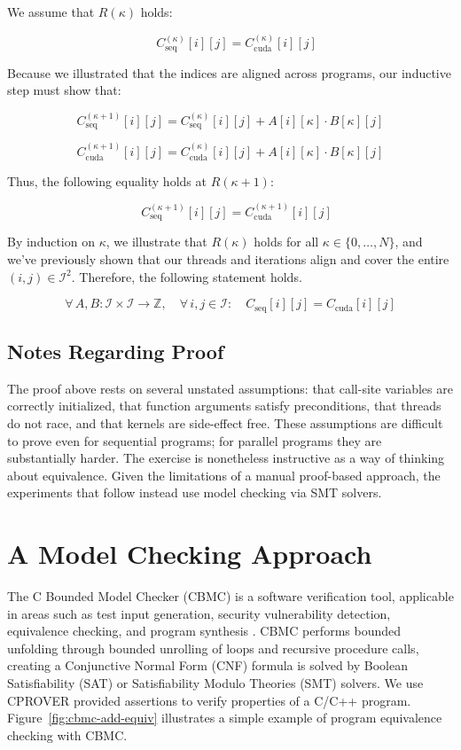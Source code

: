 \documentclass{article}
\begin{document}
We assume that $R(\kappa)$ holds: 

$$\quad C^{(\kappa)}_{\text{seq}}[i][j] = C^{(\kappa)}_{\text{cuda}}[i][j]$$

Because we illustrated that the indices are aligned across programs, our inductive step must show that:

$$C_{\text{seq}}^{(\kappa+1)}[i][j] = C_{\text{seq}}^{(\kappa)}[i][j] + A[i][\kappa] \cdot B[\kappa][j]$$

$$C_{\text{cuda}}^{(\kappa+1)}[i][j] = C_{\text{cuda}}^{(\kappa)}[i][j] + A[i][\kappa] \cdot B[\kappa][j]$$

Thus, the following equality holds at $R(\kappa + 1)$:

$$\quad C^{(\kappa + 1)}_{\text{seq}}[i][j] = C^{(\kappa + 1)}_{\text{cuda}}[i][j]$$

By induction on $\kappa$, we illustrate that $R(\kappa)$ holds for all $\kappa \in \{0,\ldots,N\}$, and we've previously shown that our threads and iterations align and cover the entire $(i,j) \in \mathcal{I}^2$. Therefore, the following statement holds.

$$\forall\, A, B : \mathcal{I} \times \mathcal{I} \to \mathbb{Z}, \quad \forall\, i, j \in \mathcal{I}: \quad C_{\text{seq}}[i][j] = C_{\text{cuda}}[i][j]$$

\subsection{Notes Regarding Proof}

The proof above rests on several unstated assumptions: that call-site variables are correctly initialized, that function arguments satisfy preconditions, that threads do not race, and that kernels are side-effect free. These assumptions are difficult to prove even for sequential programs; for parallel programs they are substantially harder. The exercise is nonetheless instructive as a way of thinking about equivalence. Given the limitations of a manual proof-based approach, the experiments that follow instead use model checking via SMT solvers.

\section{A Model Checking Approach}

The C Bounded Model Checker (CBMC) is a software verification tool, applicable in areas such as test input generation, security vulnerability detection, equivalence checking, and program synthesis \cite{kroening2023cbmccboundedmodel}. CBMC performs bounded unfolding through bounded unrolling of loops and recursive procedure calls, creating a Conjunctive Normal Form (CNF) formula is solved by Boolean Satisfiability (SAT) or Satisfiability Modulo Theories (SMT) solvers. We use CPROVER provided assertions to verify properties of a C/C++ program. Figure~\ref{fig:cbmc-add-equiv} illustrates a simple example of program equivalence checking with CBMC.
\end{document}
